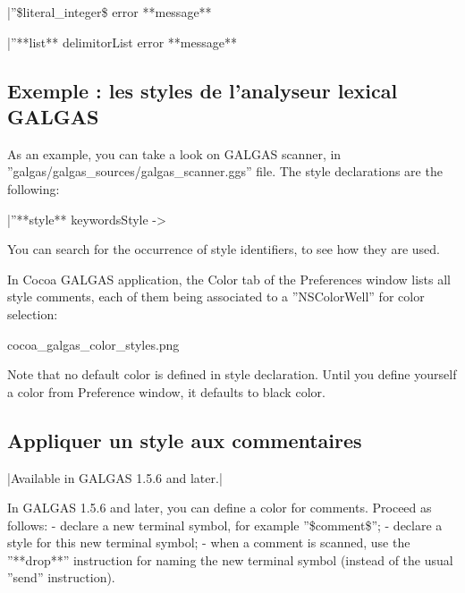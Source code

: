 |''\$literal\_integer\$ error **message** %

|''**list** delimitorList error **message** %

\subsection{Exemple : les styles de l'analyseur lexical GALGAS}

As an example, you can take a look on GALGAS scanner, in ''galgas/galgas\_sources/galgas\_scanner.ggs'' file. The style declarations are the following:

|''**style** keywordsStyle -> %

You can search for the occurrence of style identifiers, to see how they are used.

In Cocoa GALGAS application, the Color tab of the Preferences window lists all style comments, each of them being associated to a ''NSColorWell'' for color selection:

{{cocoa\_galgas\_color\_styles.png}}

Note that no default color is defined in style declaration. Until you define yourself a color from Preference window, it defaults to black color.

\subsection{Appliquer un style aux commentaires}
|Available in GALGAS 1.5.6 and later.|

In GALGAS 1.5.6 and later, you can define a color for comments. Proceed as follows:
  - declare a new terminal symbol, for example ''\$comment\$'';
  - declare a style for this new terminal symbol;
  - when a comment is scanned, use the ''**drop**'' instruction for naming the new terminal symbol (instead of the usual ''send'' instruction).

